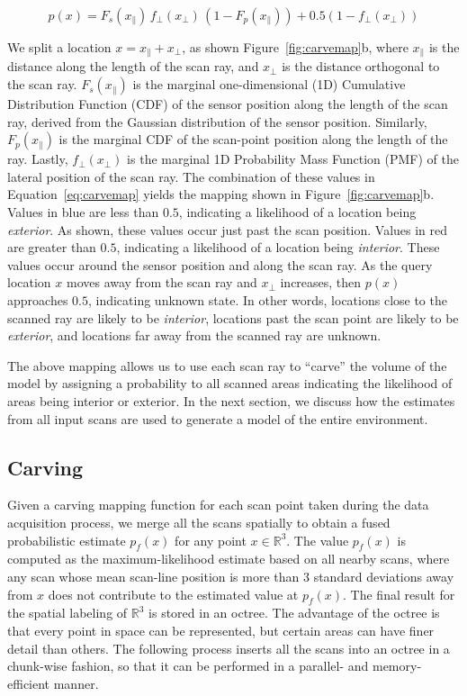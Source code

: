 \documentclass[review]{acmsiggraph}
\begin{document}
\begin{equation}
	p(x) = F_s(x_{\parallel}) \, f_{\perp}(x_{\perp}) \, (1 - F_p(x_{\parallel})) + 0.5 (1 - f_{\perp}(x_{\perp}))
	\label{eq:carvemap}
\end{equation}

We split a location $x = x_{\parallel} + x_{\perp}$, as shown Figure~\ref{fig:carvemap}b, where $x_{\parallel}$ is the distance along the length of the scan ray, and $x_{\perp}$ is the distance orthogonal to the scan ray.  $F_s(x_{\parallel})$ is the marginal one-dimensional (1D) Cumulative Distribution Function (CDF) of the sensor position along the length of the scan ray, derived from the Gaussian distribution of the sensor position.  Similarly, $F_p(x_{\parallel})$ is the marginal CDF of the scan-point position along the length of the ray.  Lastly, $f_{\perp}(x_{\perp})$ is the marginal 1D Probability Mass Function (PMF) of the lateral position of the scan ray.  The combination of these values in Equation~\ref{eq:carvemap} yields the mapping shown in Figure~\ref{fig:carvemap}b.  Values in blue are less than $0.5$, indicating a likelihood of a location being {\it exterior}.  As shown, these values occur just past the scan position.  Values in red are greater than $0.5$, indicating a likelihood of a location being {\it interior}.  These values occur around the sensor position and along the scan ray.  As the query location $x$ moves away from the scan ray and $x_{\perp}$ increases, then $p(x)$ approaches $0.5$, indicating unknown state.  In other words, locations close to the scanned ray are likely to be {\it interior}, locations past the scan point are likely to be {\it exterior}, and locations far away from the scanned ray are unknown.

The above mapping allows us to use each scan ray to ``carve'' the volume of the model by assigning a probability to all scanned areas indicating the likelihood of areas being interior or exterior.  In the next section, we discuss how the estimates from all input scans are used to generate a model of the entire environment.

\subsection{Carving}
\label{ssec:carving}

Given a carving mapping function for each scan point taken during the data acquisition process, we merge all the scans spatially to obtain a fused probabilistic estimate $p_f(x)$ for any point $x \in \mathbb{R}^3$.  The value $p_f(x)$ is computed as the maximum-likelihood estimate based on all nearby scans, where any scan whose mean scan-line position is more than $3$ standard deviations away from $x$ does not contribute to the estimated value at $p_f(x)$.  The final result for the spatial labeling of $\mathbb{R}^3$ is stored in an octree.  The advantage of the octree is that every point in space can be represented, but certain areas can have finer detail than others.  The following process inserts all the scans into an octree in a chunk-wise fashion, so that it can be performed in a parallel- and memory-efficient manner.
\end{document}
